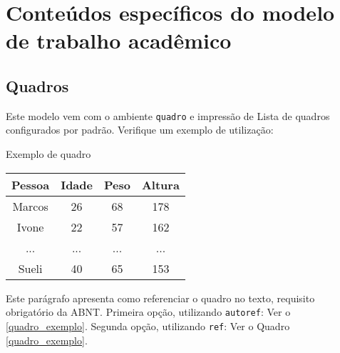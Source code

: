 

\chapter{Conteúdos específicos do modelo de trabalho acadêmico}
\label{cap_trabalho_academico}

\section{Quadros}

Este modelo vem com o ambiente \texttt{quadro} e impressão de Lista de quadros configurados por padrão. Verifique um exemplo de utilização:

\begin{quadro}[htb]
	\caption{\label{quadro_exemplo}Exemplo de quadro}
	\begin{tabular}{|c|c|c|c|}
		\hline
		\textbf{Pessoa} & \textbf{Idade} & \textbf{Peso} & \textbf{Altura} \\ \hline
		Marcos & 26    & 68   & 178    \\ \hline
		Ivone  & 22    & 57   & 162    \\ \hline
		...    & ...   & ...  & ...    \\ \hline
		Sueli  & 40    & 65   & 153    \\ \hline
	\end{tabular}
\end{quadro}

Este parágrafo apresenta como referenciar o quadro no texto, requisito obrigatório da ABNT. Primeira opção, utilizando \texttt{autoref}: Ver o \autoref{quadro_exemplo}. Segunda opção, utilizando  \texttt{ref}: Ver o Quadro \ref{quadro_exemplo}.

